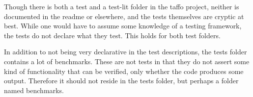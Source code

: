 Though there is both a test and a test-lit folder in the taffo project, neither is documented in the readme or elsewhere, and the tests themselves are cryptic at best. While one would have to assume some knowledge of a testing framework, the tests do not declare what they test. This holds for both test folders. 

In addition to not being very declarative in the test descriptions, the tests folder contains a lot of benchmarks. These are not tests in that they do not assert some kind of functionality that can be verified, only whether the code produces \*some\* output. Therefore it should not reside in the tests folder, but perhaps a folder named benchmarks.


